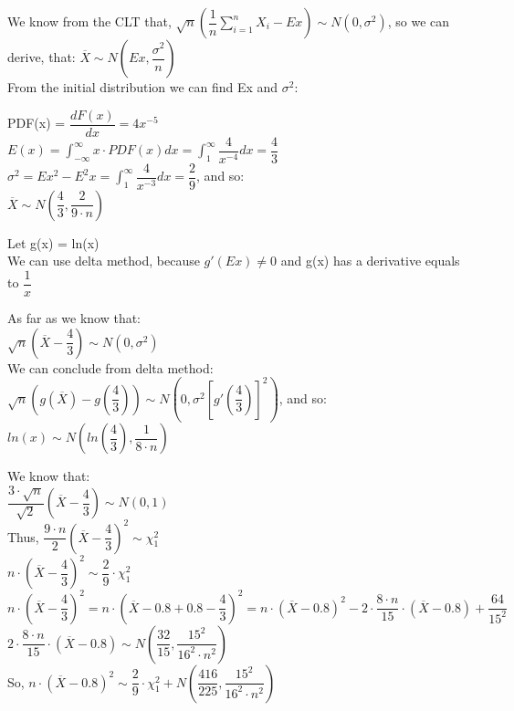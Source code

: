 \documentclass[12pt]{article}
\begin{document}
\begin{list}{()~}{}
\item
We know from the CLT that, $\sqrt{n}\left(\dfrac{1}{n} \sum^{n}_{i = 1} X_i - Ex\right) \sim N(0,\sigma^2)$, so we can derive, that: $\overline{X} \sim N\left(Ex, \dfrac{\sigma^2}{n}\right)$\\

From the initial distribution we can find Ex and $\sigma^2$:

PDF(x) = $\dfrac{d F(x)}{dx} = 4 x^{-5}$\\
$E(x) = \int_{-\infty}^{\infty} x \cdot PDF(x) dx = \int_{1}^{\infty} \dfrac{4}{x^{-4}} dx = \dfrac{4}{3}$ \\
$\sigma^2 = Ex^2 - E^2x = \int_{1}^{\infty} \dfrac{4}{x^{-3}} dx = \dfrac{2}{9}$, and so:\\
$\overline{X} \sim N\left(\dfrac{4}{3}, \dfrac{2}{9 \cdot n}\right)$\\
\item
Let g(x) = ln(x)\\

We can use delta method, because $g'(Ex) \neq 0$ and g(x) has a derivative equals to $\dfrac{1}{x}$

As far as we know that:\\
$\sqrt{n}\left(\overline{X} - \dfrac{4}{3}\right) \sim N(0,\sigma^2)$\\
We can conclude from delta method:\\
$\sqrt{n} \left(g(\overline{X}) - g\left(\dfrac{4}{3}\right)\right) \sim N\left(0, \sigma^2 \left[ g'\left(\dfrac{4}{3}\right) \right]^2\right)$, and so:\\
$ln\left(x\right) \sim N\left(ln\left(\dfrac{4}{3}\right), \dfrac{1}{8 \cdot n}\right)$
\item
We know that: \\
$\dfrac{3 \cdot \sqrt{n}}{\sqrt{2}} \left(\overline{X} - \dfrac{4}{3}\right) \sim N(0,1)$\\
Thus, $\dfrac{9 \cdot n}{2}\left(\overline{X} - \dfrac{4}{3}\right)^2 \sim \chi_1^2$\\
$n \cdot \left(\overline{X} - \dfrac{4}{3}\right)^2 \sim \dfrac{2}{9} \cdot \chi_1^2$\\
$n \cdot \left(\overline{X} - \dfrac{4}{3}\right)^2 = n \cdot \left(\overline{X} - 0.8 + 0.8 - \dfrac{4}{3}\right)^2 = n \cdot \left(\overline{X} - 0.8\right)^2 - 2 \cdot \dfrac{8 \cdot n}{15} \cdot \left(\overline{X} - 0.8\right) + \dfrac{64}{15^2}$\\
$2 \cdot \dfrac{8 \cdot n}{15} \cdot \left(\overline{X} - 0.8\right) \sim N\left(\dfrac{32}{15}, \dfrac{15^2}{16^2 \cdot n^2}\right)$\\
So, $n \cdot \left(\overline{X} - 0.8\right)^2 \sim \dfrac{2}{9} \cdot \chi_1^2 + N\left(\dfrac{416}{225}, \dfrac{15^2}{16^2 \cdot n^2}\right)$
\end{list}
\end{document}
